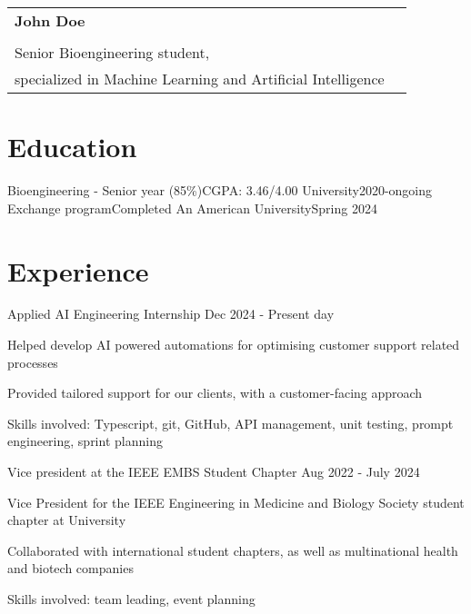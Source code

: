 \documentclass{resume}
\newcommand{\name}{John Doe} %
\begin{document}
    \selectfont

    {
        \begin{tabularx}{\linewidth}{L r}
            \\
            \textbf{\Huge \name} & \\
            & \\
            Senior Bioengineering student, &
            \\
            specialized in Machine Learning and Artificial Intelligence &
        \end{tabularx}
    }




    \section{\textbf{Education}} \label{sec:education}
    \resumeSubHeadingListStart
    \resumeSubheading
    {Bioengineering - Senior year (85\%)}{CGPA: 3.46/4.00}
    {University}{2020-ongoing}
    \resumeSubheading
    { Exchange program}{Completed}
    {An American University}{Spring 2024}
    \resumeSubHeadingListEnd

    \vspace{-5mm}


    \section{\textbf{Experience}} \label{sec:experience}
    \resumeSubHeadingListStart
    \resumeSubheading
    {Applied AI Engineering Internship}
    {}{}{Dec 2024 - Present day}
    \vspace{-5mm}
    \resumeItemListStart
    \item
    {Helped develop AI powered automations for optimising
    customer support related processes}
    \item {Provided tailored support for our clients, with a customer-facing approach}
    \item {Skills involved: Typescript, git, GitHub, API management, unit testing, prompt engineering, sprint planning}
    \resumeItemListEnd

    \resumeSubheading
    {Vice president at the IEEE EMBS Student Chapter}{}
    {}{Aug 2022 - July 2024}
    \vspace{-5mm}
    \resumeItemListStart
    \item{Vice President for the IEEE Engineering in Medicine and Biology Society student chapter at University}
    \item{Collaborated with international student chapters,
        as well as multinational health and biotech companies}
    \item {Skills involved: team leading, event planning}
    \resumeItemListEnd
\end{document}
